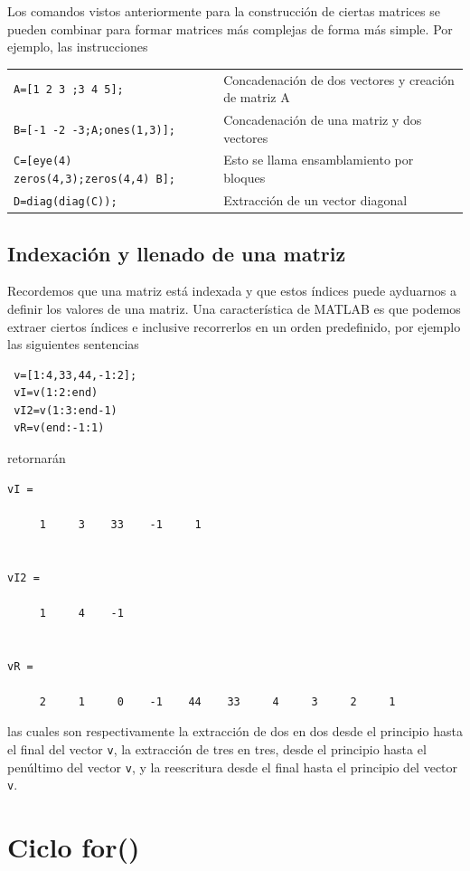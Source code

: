 \documentclass[11pt,legalpaper]{article}
\begin{document}
Los comandos vistos anteriormente para la construcci\'on de ciertas matrices se pueden combinar para formar matrices m\'as complejas de forma m\'as simple. Por ejemplo, las instrucciones

\begin{center}
\begin{tabular}{l|p{}}
\texttt{A=[1 2 3 ;3 4 5];}
	& Concadenaci\'on de dos vectores y creaci\'on de matriz A\\
\texttt{B=[-1 -2 -3;A;ones(1,3)];}
	&Concadenaci\'on de una matriz y dos vectores\\
\texttt{C=[eye(4) zeros(4,3);zeros(4,4) B];} 
	& Esto se llama ensamblamiento por bloques\\
\texttt{D=diag(diag(C));}
	& Extracci\'on de un vector diagonal\\
\end{tabular}
\end{center}

%
\subsection{Indexaci\'on y llenado de una matriz}
Recordemos que una matriz est\'a indexada y que estos \'indices puede ayduarnos a definir los valores de una matriz. 
Una caracter\'istica de MATLAB es que podemos extraer ciertos \'indices e inclusive recorrerlos en un orden predefinido, 
por ejemplo las siguientes sentencias
\begin{lstlisting}
 v=[1:4,33,44,-1:2];
 vI=v(1:2:end)
 vI2=v(1:3:end-1)
 vR=v(end:-1:1)
\end{lstlisting}
retornar\'an
\begin{verbatim}
vI =

     1     3    33    -1     1


vI2 =

     1     4    -1


vR =

     2     1     0    -1    44    33     4     3     2     1
\end{verbatim}
las cuales son respectivamente la extracci\'on de dos en dos desde el principio hasta el final del vector
\texttt{v}, la extracci\'on de tres en tres, desde el principio hasta el pen\'ultimo del vector \texttt{v},
y la reescritura desde el final hasta el principio del vector \texttt{v}.




\section{Ciclo for()}
\end{document}
